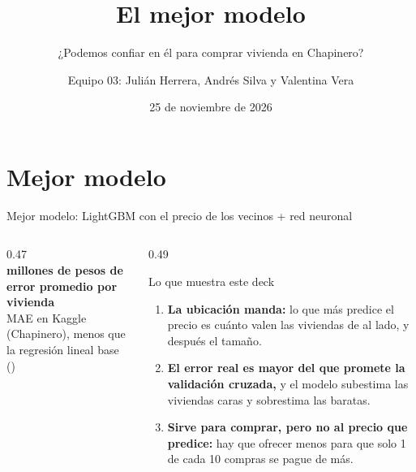 \documentclass[aspectratio=169, 10pt]{beamer}
\title{El mejor modelo}
\subtitle{¿Podemos confiar en \'el para comprar vivienda en Chapinero?}
\author{Equipo 03: Juli\'an Herrera, Andr\'es Silva y Valentina Vera}
\institute{MECA 4107 Big Data y Machine Learning para Econom\'ia Aplicada, Universidad de los Andes}
\date{25 de noviembre de 2026}
\begin{document}
\maketitle

\section{Mejor modelo}

\begin{frame}{Mejor modelo: LightGBM con el precio de los vecinos + red neuronal}
  \begin{columns}[c, onlytextwidth]
    \begin{column}{0.47\textwidth}
      \centering
      {\fontsize{30}{32}\selectfont\bfseries\color{accent}\MAEKaggle}\\[1mm]
      {\small\bfseries millones de pesos de error promedio por vivienda}\\[0.5mm]
      {\scriptsize MAE en Kaggle (Chapinero), \MejoraPctBase{} menos que la regresi\'on lineal base (\MAEBase)}
      \vspace{5mm}

    \end{column}
    \begin{column}{0.49\textwidth}
      \begin{block}{Lo que muestra este deck}
        \small
        \begin{enumerate}\setlength{\itemsep}{3pt}
          \item \textbf{La ubicaci\'on manda:} lo que m\'as predice el precio es cu\'anto valen las viviendas de al lado, y despu\'es el tama\~no.
          \item \textbf{El error real es mayor del que promete la validaci\'on cruzada,} y el modelo subestima las viviendas caras y sobrestima las baratas.
          \item \textbf{Sirve para comprar, pero no al precio que predice:} hay que ofrecer \MargenRegla{} menos para que solo 1 de cada 10 compras se pague de m\'as.
        \end{enumerate}
      \end{block}
    \end{column}
  \end{columns}
\end{frame}
\end{document}
